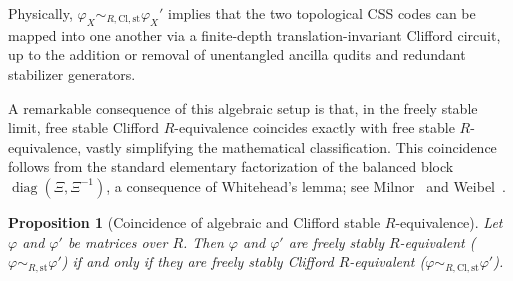 \documentclass[aps,prx,english,superscriptaddress,twocolumn,tightenlines,showpacs,longbibliography,floatfix,amsfonts]{revtex4-2}
\newtheorem{proposition}{Proposition}
\theoremstyle{remark}
\theoremstyle{definition}
\begin{document}
Physically, $\varphi_X \sim_{R,\mathrm{Cl},\mathrm{st}} \varphi_X'$ implies that the two topological CSS codes can be mapped into one another via a finite-depth translation-invariant Clifford circuit, up to the addition or removal of unentangled ancilla qudits and redundant stabilizer generators.

A remarkable consequence of this algebraic setup is that, in the freely stable limit, free stable Clifford \(R\)-equivalence coincides exactly with free stable \(R\)-equivalence, vastly simplifying the mathematical classification. This coincidence follows from the standard elementary factorization of the balanced block \(\operatorname{diag}(\Xi,\Xi^{-1})\), a consequence of Whitehead's lemma; see Milnor~\cite[Sec.~3]{milnor1971introduction} and Weibel~\cite[Chap.~III, Secs.~1.2--1.3]{weibel2013kbook}.

\begin{proposition}[Coincidence of algebraic and Clifford stable \(R\)-equivalence]
	\label{lem:stable-clifford-equivalence}
	Let $\varphi$ and $\varphi'$ be matrices over $R$. Then $\varphi$ and $\varphi'$ are freely stably \(R\)-equivalent ($\varphi \sim_{R,\mathrm{st}} \varphi'$) if and only if they are freely stably Clifford \(R\)-equivalent ($\varphi \sim_{R,\mathrm{Cl},\mathrm{st}} \varphi'$).
\end{proposition}
\end{document}
